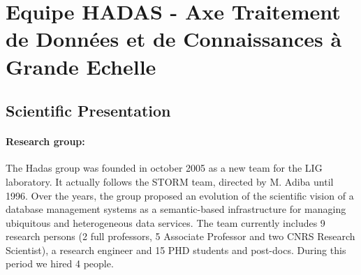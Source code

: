 

\section{Equipe HADAS - Axe Traitement de Donn{\'e}es et de Connaissances {\`a} Grande Echelle} 
\label{sec:hadas}

\subsection{Scientific Presentation} %
\label{sub:hadas_scientific_presentation}


\paragraph{Research group:}

The Hadas group was founded in october 2005 as a new team for the LIG laboratory. It actually follows the STORM team, directed by M. Adiba until 1996. 
Over the years, the group  proposed an evolution of the scientific vision of a database management systems  as  a semantic-based infrastructure for managing ubiquitous and heterogeneous data services. 
The team currently includes 9 research persons (2 full professors, 5 Associate Professor and two CNRS Research Scientist),  a research engineer and 15 PHD students and post-docs. During this period we hired 4 people. 


